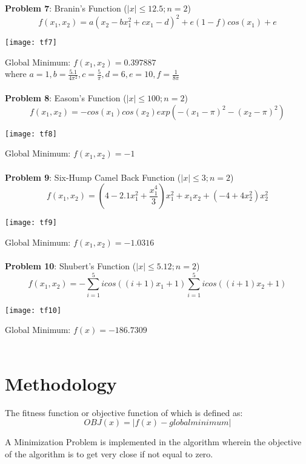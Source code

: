 \documentclass{article}
\begin{document}
\textbf{Problem 7}: Branin's Function ($|x| \leq 12.5; n=2$)
\begin{equation}
f(x_1,x_2) = a(x_2 - bx^2_1 + cx_1 - d)^2 + e(1 - f)cos(x_1) + e
\end{equation}
\centerline{\texttt{[image: tf7]}}
Global Minimum: $f(x_1,x_2) = 0.397887$\\
where $a=1, b=\frac{5.1}{4\pi^2}, c=\frac{5}{\pi}, d=6, e=10, f=\frac{1}{8\pi}$\\\\
\textbf{Problem 8}: Easom's Function ($|x| \leq 100; n=2$)
\begin{equation}
f(x_1,x_2) = -cos(x_1)cos(x_2)exp(-(x_1 - \pi)^2 - (x_2 - \pi)^2)
\end{equation}
\centerline{\texttt{[image: tf8]}}
Global Minimum: $f(x_1,x_2) = -1$\\\\
\textbf{Problem 9}: Six-Hump Camel Back Function ($|x| \leq 3; n=2$)
\begin{equation}
f(x_1,x_2) = (4 - 2.1x^2_1 + \frac{x^4_1}{3})x^2_1 + x_1 x_2 + (-4 + 4x^2_2)x^2_2
\end{equation}
\centerline{\texttt{[image: tf9]}}
Global Minimum: $f(x_1,x_2) = -1.0316$\\\\
\textbf{Problem 10}: Shubert's Function ($|x| \leq 5.12; n=2$)
\begin{equation}
f(x_1,x_2) = -\sum^5_{i=1}icos((i + 1)x_1 + 1)\sum^5_{i=1}icos((i + 1)x_2 + 1)
\end{equation}
\centerline{\texttt{[image: tf10]}}
Global Minimum: $f(x) = -186.7309$\\\\

\section{Methodology}
The fitness function or objective function of which is defined as:
\begin{equation}
OBJ(x) = |f(x) - global minimum|
\end{equation}

A Minimization Problem is implemented in the algorithm wherein the objective of the algorithm is to get very close if not equal to zero.
\end{document}
